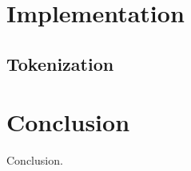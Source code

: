 \documentclass[a4paper,12pt]{article}
\theoremstyle{definition}
\begin{document}
\section{Implementation}
\subsection{Tokenization}

\section{Conclusion}
Conclusion.
\printbibliography
\end{document}
